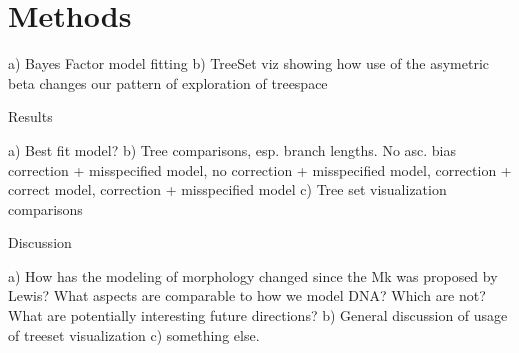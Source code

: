 \documentclass[]{article}
\begin{document}
\section{Methods}

	a) Bayes Factor model fitting
	b) TreeSet viz showing how use of the asymetric beta changes our pattern of exploration of treespace
	
Results

	a) Best fit model?
	b) Tree comparisons, esp. branch lengths. No asc. bias correction + misspecified model, no correction + misspecified model, correction + correct model, correction + misspecified model 
	c) Tree set visualization comparisons
	
Discussion	

	a) How has the modeling of morphology changed since the Mk was proposed by Lewis? What aspects are comparable to how we model DNA? Which are not? What are potentially interesting future directions? 
	b) General discussion of usage of treeset visualization
	c) something else.
\end{document}
